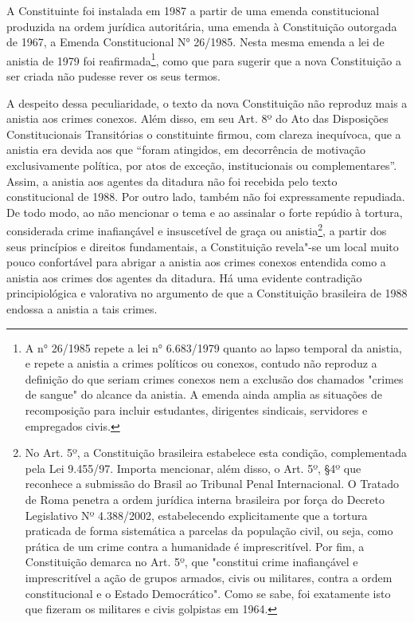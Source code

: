 A Constituinte foi instalada em 1987 a partir de uma emenda
constitucional produzida na ordem jurídica autoritária, uma emenda à
Constituição outorgada de 1967, a Emenda Constitucional N° 26/1985.
Nesta mesma emenda a lei de anistia de 1979 foi reafirmada\footnote{A 
  n° 26/1985 repete a lei n° 6.683/1979 quanto ao lapso temporal da
  anistia, e repete a anistia a crimes políticos ou conexos, contudo não
  reproduz a definição do que seriam crimes conexos nem a exclusão dos
  chamados "crimes de sangue" do alcance da anistia. A emenda ainda
  amplia as situações de recomposição para incluir estudantes,
  dirigentes sindicais, servidores e empregados civis.}, como que para
sugerir que a nova Constituição a ser criada não pudesse rever os seus
termos.

A despeito dessa peculiaridade, o texto da nova Constituição não
reproduz mais a anistia aos crimes conexos. Além disso, em seu Art. 8º
do Ato das Disposições Constitucionais Transitórias o constituinte
firmou, com clareza inequívoca, que a anistia era devida aos que ``foram
atingidos, em decorrência de motivação exclusivamente política, por atos
de exceção, institucionais ou complementares''. Assim, a anistia aos
agentes da ditadura não foi recebida pelo texto constitucional de 1988.
Por outro lado, também não foi expressamente repudiada. De todo modo, ao
não mencionar o tema e ao assinalar o forte repúdio à tortura,
considerada crime inafiançável e insuscetível de graça ou
anistia\footnote{No Art. 5º,  a Constituição brasileira estabelece
  esta condição, complementada pela Lei 9.455/97. Importa mencionar,
  além disso, o Art. 5º, §4º que reconhece a submissão do Brasil ao
  Tribunal Penal Internacional. O Tratado de Roma penetra a ordem
  jurídica interna brasileira por força do Decreto Legislativo Nº
  4.388/2002, estabelecendo explicitamente que a tortura praticada de
  forma sistemática a parcelas da população civil, ou seja, como prática
  de um crime contra a humanidade é imprescritível. Por fim, a
  Constituição demarca no Art. 5º,  que "constitui crime
  inafiançável e imprescritível a ação de grupos armados, civis ou
  militares, contra a ordem constitucional e o Estado Democrático". Como
  se sabe, foi exatamente isto que fizeram os militares e civis
  golpistas em 1964.}, a partir dos seus princípios e direitos
fundamentais, a Constituição revela"-se um local muito pouco confortável
para abrigar a anistia aos crimes conexos entendida como a anistia aos
crimes dos agentes da ditadura. Há uma evidente contradição
principiológica e valorativa no argumento de que a Constituição
brasileira de 1988 endossa a anistia a tais crimes.

